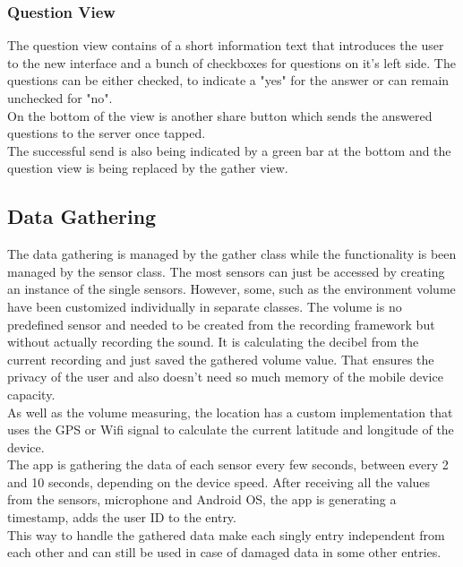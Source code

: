 \subsubsection{Question View}
The question view contains of a short information text that introduces the user to the new interface and a bunch of checkboxes for questions on it's left side. 
The questions can be either checked, to indicate a "yes" for the answer or can remain unchecked for "no".\\
On the bottom of the view is another share button which sends the answered questions to the server once tapped.\\
The successful send is also being indicated by a green bar at the bottom and the question view is being replaced by the gather view. 

\subsection{Data Gathering}
The data gathering is managed by the gather class while the functionality is been managed by the sensor class. The most sensors can just be accessed by creating an instance of the single sensors. However, some, such as the environment volume have been customized individually in separate classes. The volume is no predefined sensor and needed to be created from the recording framework but without actually recording the sound. It is calculating the decibel from the current recording and just saved the gathered volume value. That ensures the privacy of the user and also doesn't need so much memory of the mobile device capacity.\\
As well as the volume measuring, the location has a custom implementation that uses the GPS or Wifi signal to calculate the current latitude and longitude of the device. \\
The app is gathering the data of each sensor every few seconds, between every 2 and 10 seconds, depending on the device speed. After receiving all the values from the sensors, microphone and Android OS, the app is generating a timestamp, adds the user ID to the entry.\\
This way to handle the gathered data make each singly entry independent from each other and can still be used in case of damaged data in some other entries. 

